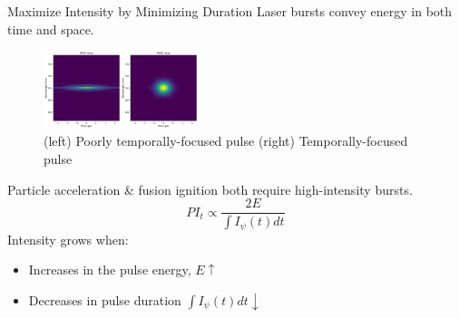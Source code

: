 \documentclass{beamer}
\newcommand{\highlight}[1]{\textcolor{myprimary}{#1}}
\newcommand{\notebox}[1]{\colorbox{myprimary!30}{#1}}
\begin{document}
\begin{frame}{Maximize Intensity by Minimizing Duration}
    Laser bursts convey energy in both \highlight{time} and \highlight{space}.
    \begin{figure}
        \includegraphics[width=0.4\textwidth]{images/frogs.png}
        \caption{(left) Poorly temporally-focused pulse (right) Temporally-focused pulse}
    \end{figure}
    Particle acceleration \& fusion ignition both require high-intensity bursts.
    \[
        PI_t \propto \frac{2E}{\int I_\psi(t) dt}
    \]
    \highlight{Intensity grows when:}
    \begin{itemize}
        \item Increases in the pulse energy, $E \uparrow$
        \item Decreases in pulse duration \notebox{$\int I_\psi(t) dt \downarrow$}
    \end{itemize}
\end{frame}
\end{document}
